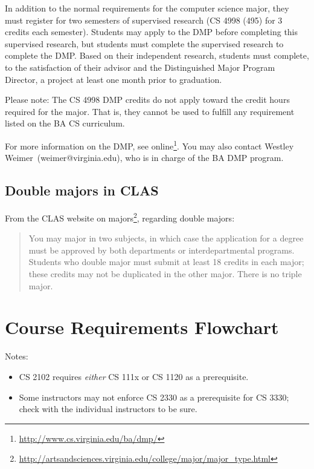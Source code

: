 \documentclass[10pt,letter]{book}
\makeatletter
\newenvironment{itemlist}{
\begin{itemize}
\setlength{\itemsep}{0pt}
\setlength{\parskip}{0pt}}
{\end{itemize}}
\newcommand{\badmp}{Westley Weimer}
\newcommand{\badmpemail}{weimer@virginia.edu}
\newcommand{\mysection}[1]{\section{#1}\renewcommand{\rightmark}{#1}}
\newcommand{\myurl}[1]{\footnote{\scriptsize\url{#1}}}
\makeatother
\begin{document}
In addition to the normal requirements for the computer science major,
they must register for two semesters of supervised research (CS 4998 (495)
for 3 credits each semester). Students may apply to the DMP before
completing this supervised research, but students must complete the
supervised research to complete the DMP. Based on their independent
research, students must complete, to the satisfaction of their advisor
and the Distinguished Major Program Director, a project at least one
month prior to graduation.

Please note: The CS 4998 DMP credits do not apply toward the credit
hours required for the major. That is, they cannot be used to fulfill
any requirement listed on the BA CS curriculum.

For more information on the DMP, see
online\myurl{http://www.cs.virginia.edu/ba/dmp/}. You may
also contact \badmp\ (\badmpemail), who is in charge of the BA DMP
program.

\subsection{Double majors in CLAS}

From the CLAS website on majors\myurl{http://artsandsciences.virginia.edu/college/major/major_type.html},
regarding double majors:

\begin{quotation}
\noindent You may major in two subjects, in which case the application
for a degree must be approved by both departments or inter\-departmental
programs. Students who double major must submit at least 18 credits in
each major; these credits may not be duplicated in the other
major. There is no triple major.
\end{quotation}


\clearpage

\mysection{Course Requirements Flowchart}

\begin{figure}[h!]
\end{figure}

\noindent Notes:

\begin{itemlist}
\item CS 2102 requires {\em either} CS 111x or CS 1120 as a
  prerequisite.
\item Some instructors may not enforce CS 2330 as a prerequisite for
  CS 3330; check with the individual instructors to be sure.
\end{itemlist}
\end{document}
